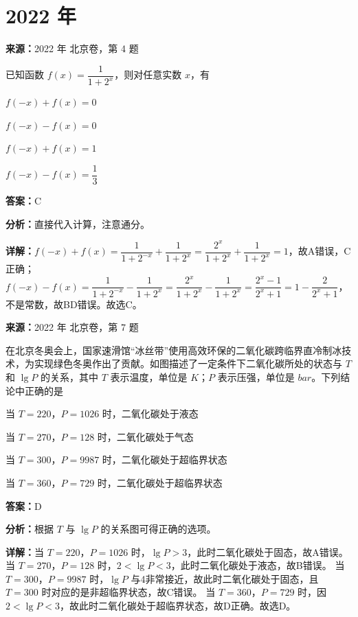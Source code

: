 \section*{2022 年}

\begin{question}[points=4]
\textbf{来源：}2022 年 北京卷，第 4 题\par
已知函数 $f(x) = \dfrac{1}{1+2^x}$，则对任意实数 $x$，有
\begin{choices}
  \item $f(-x) + f(x) = 0$
  \item $f(-x) - f(x) = 0$
  \item $f(-x) + f(x) = 1$
  \item $f(-x) - f(x) = \dfrac{1}{3}$
\end{choices}
\begin{solution}
\textbf{答案：}C

\textbf{分析：}直接代入计算，注意通分。

\textbf{详解：}$f(-x) + f(x) = \dfrac{1}{1+2^{-x}} + \dfrac{1}{1+2^x} = \dfrac{2^x}{1+2^x} + \dfrac{1}{1+2^x} = 1$，故A错误，C正确；$f(-x) - f(x) = \dfrac{1}{1+2^{-x}} - \dfrac{1}{1+2^x} = \dfrac{2^x}{1+2^x} - \dfrac{1}{1+2^x} = \dfrac{2^x-1}{2^x+1} = 1 - \dfrac{2}{2^x+1}$，不是常数，故BD错误。故选C。
\end{solution}
\end{question}

\begin{question}[points=4]
\textbf{来源：}2022 年 北京卷，第 7 题\par
在北京冬奥会上，国家速滑馆“冰丝带”使用高效环保的二氧化碳跨临界直冷制冰技术，为实现绿色冬奥作出了贡献。如图描述了一定条件下二氧化碳所处的状态与 $T$ 和 $\lg P$ 的关系，其中 $T$ 表示温度，单位是 $K$；$P$ 表示压强，单位是 $bar$。下列结论中正确的是
\begin{choices}
  \item 当 $T = 220$，$P = 1026$ 时，二氧化碳处于液态
  \item 当 $T = 270$，$P = 128$ 时，二氧化碳处于气态
  \item 当 $T = 300$，$P = 9987$ 时，二氧化碳处于超临界状态
  \item 当 $T = 360$，$P = 729$ 时，二氧化碳处于超临界状态
\end{choices}
\begin{solution}
\textbf{答案：}D

\textbf{分析：}根据 $T$ 与 $\lg P$ 的关系图可得正确的选项。

\textbf{详解：}当 $T = 220$，$P = 1026$ 时，$\lg P > 3$，此时二氧化碳处于固态，故A错误。
当 $T = 270$，$P = 128$ 时，$2 < \lg P < 3$，此时二氧化碳处于液态，故B错误。
当 $T = 300$，$P = 9987$ 时，$\lg P$ 与4非常接近，故此时二氧化碳处于固态，且 $T=300$ 时对应的是非超临界状态，故C错误。
当 $T = 360$，$P = 729$ 时，因 $2 < \lg P < 3$，故此时二氧化碳处于超临界状态，故D正确。故选D。
\end{solution}
\end{question}

